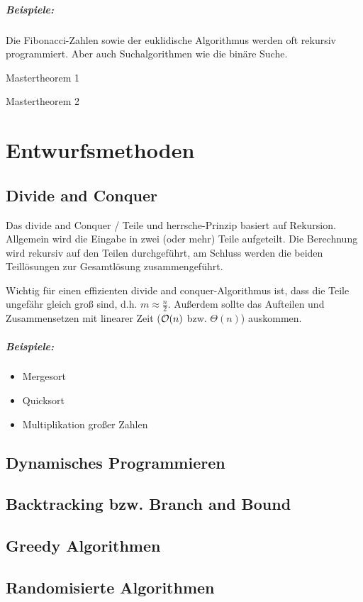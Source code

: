 \paragraph{Beispiele:} Die Fibonacci-Zahlen sowie der euklidische Algorithmus werden oft rekursiv programmiert.
Aber auch Suchalgorithmen wie die binäre Suche.

\begin{satz}{Mastertheorem 1}
	
\end{satz}

\begin{satz}{Mastertheorem 2}
	
\end{satz}




\chapter{Entwurfsmethoden}
\section{Divide and Conquer}
Das divide and Conquer / Teile und herrsche-Prinzip basiert auf Rekursion. Allgemein wird die Eingabe in zwei (oder mehr) Teile aufgeteilt. Die Berechnung wird rekursiv auf den Teilen durchgeführt, am Schluss werden die beiden Teillösungen zur Gesamtlösung zusammengeführt.

Wichtig für einen effizienten divide and conquer-Algorithmus ist, dass die Teile ungefähr gleich groß sind, d.h. $m\approx \frac n2$. Außerdem sollte das Aufteilen und Zusammensetzen mit linearer Zeit ($\mathcal O(n)$ bzw. $\Theta(n)$) auskommen.

\paragraph{Beispiele:}
\begin{itemize}
	\item Mergesort
	\item Quicksort
	\item Multiplikation großer Zahlen
\end{itemize}

\section{Dynamisches Programmieren}
\section{Backtracking bzw. Branch and Bound}
\section{Greedy Algorithmen}
\section{Randomisierte Algorithmen}





